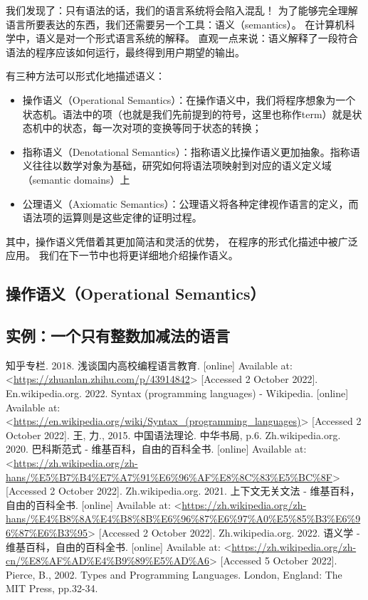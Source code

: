 \documentclass[../main.tex]{subfiles}
\begin{document}
  \indent 我们发现了：只有语法的话，我们的语言系统将会陷入混乱！
  为了能够完全理解语言所要表达的东西，我们还需要另一个工具：语义（semantics）。
  在计算机科学中，语义是对一个形式语言系统的解释。\cite{semwiki}
  直观一点来说：语义解释了一段符合语法的程序应该如何运行，最终得到用户期望的输出。

  \indent 有三种方法可以形式化地描述语义：\cite{tapl}

  \begin{itemize}
    \item 操作语义（Operational Semantics）：在操作语义中，我们将程序想象为一个状态机。语法中的项（也就是我们先前提到的符号，这里也称作term）就是状态机中的状态，每一次对项的变换等同于状态的转换；
    \item 指称语义（Denotational Semantics）：指称语义比操作语义更加抽象。指称语义往往以数学对象为基础，研究如何将语法项映射到对应的语义定义域（semantic domains）上
    \item 公理语义（Axiomatic Semantics）：公理语义将各种定律视作语言的定义，而语法项的运算则是这些定律的证明过程。
  \end{itemize}

  \indent 其中，操作语义凭借着其更加简洁和灵活的优势，
  在程序的形式化描述中被广泛应用。\cite{tapl}
  我们在下一节中也将更详细地介绍操作语义。

  \subsection{操作语义（Operational Semantics）}

  \subsection{实例：一个只有整数加减法的语言}

  \begin{thebibliography}{7}
     知乎专栏. 2018. 浅谈国内高校编程语言教育. [online] Available at: <\url{https://zhuanlan.zhihu.com/p/43914842}> [Accessed 2 October 2022].
     En.wikipedia.org. 2022. Syntax (programming languages) - Wikipedia. [online] Available at: <\url{https://en.wikipedia.org/wiki/Syntax_(programming_languages)}> [Accessed 2 October 2022].
     王, 力., 2015. 中国语法理论. 中华书局, p.6.
     Zh.wikipedia.org. 2020. 巴科斯范式 - 维基百科，自由的百科全书. [online] Available at: <\url{https://zh.wikipedia.org/zh-hans/%E5%B7%B4%E7%A7%91%E6%96%AF%E8%8C%83%E5%BC%8F}> [Accessed 2 October 2022]. 
     Zh.wikipedia.org. 2021. 上下文无关文法 - 维基百科，自由的百科全书. [online] Available at: <\url{https://zh.wikipedia.org/zh-hans/%E4%B8%8A%E4%B8%8B%E6%96%87%E6%97%A0%E5%85%B3%E6%96%87%E6%B3%95}> [Accessed 2 October 2022].
     Zh.wikipedia.org. 2022. 语义学 - 维基百科，自由的百科全书. [online] Available at: <\url{https://zh.wikipedia.org/zh-cn/%E8%AF%AD%E4%B9%89%E5%AD%A6}> [Accessed 5 October 2022].
     Pierce, B., 2002. Types and Programming Languages. London, England: The MIT Press, pp.32-34.
  \end{thebibliography}
\end{document}
